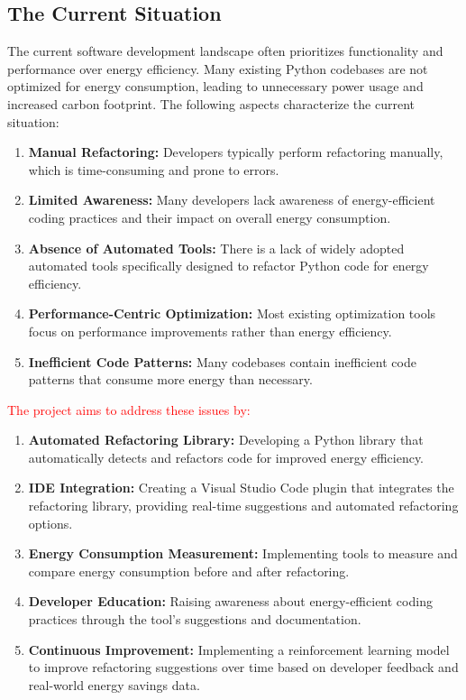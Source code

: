 \documentclass[12pt]{article}
\begin{document}
\subsection{The Current Situation}

  The current software development landscape often prioritizes functionality and performance over energy efficiency. Many existing Python codebases are not optimized for energy consumption, leading to unnecessary power usage and increased carbon footprint. The following aspects characterize the current situation:
  \begin{enumerate}
    \item \textbf{Manual Refactoring:} Developers typically perform refactoring manually, which is time-consuming and prone to errors.
    \item \textbf{Limited Awareness:} Many developers lack awareness of energy-efficient coding practices and their impact on overall energy consumption.
    \item \textbf{Absence of Automated Tools:} There is a lack of widely adopted automated tools specifically designed to refactor Python code for energy efficiency.
    \item \textbf{Performance-Centric Optimization:} Most existing optimization tools focus on performance improvements rather than energy efficiency.
    \item \textbf{Inefficient Code Patterns:} Many codebases contain inefficient code patterns that consume more energy than necessary.
  \end{enumerate}

  \textcolor{red}{The project aims to address these issues by:}
  \begin{enumerate}
    \item \textbf{Automated Refactoring Library:} Developing a Python library that automatically detects and refactors code for improved energy efficiency.
    \item \textbf{IDE Integration:} Creating a Visual Studio Code plugin that integrates the refactoring library, providing real-time suggestions and automated refactoring options.
    \item \textbf{Energy Consumption Measurement:} Implementing tools to measure and compare energy consumption before and after refactoring.
    \item \textbf{Developer Education:} Raising awareness about energy-efficient coding practices through the tool's suggestions and documentation.
    \item \textbf{Continuous Improvement:} Implementing a reinforcement learning model to improve refactoring suggestions over time based on developer feedback and real-world energy savings data.
  \end{enumerate}  
\end{document}

